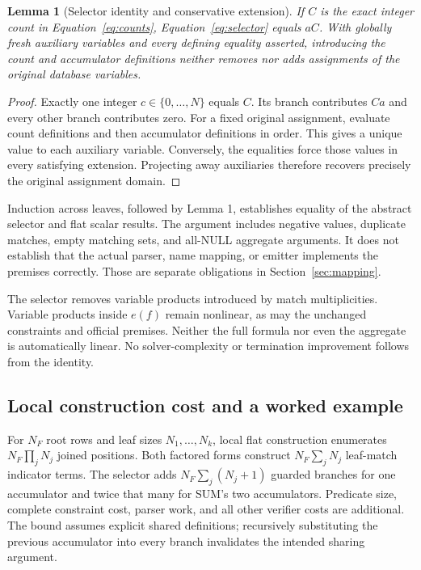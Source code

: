 \documentclass[3p,times,authoryear]{elsarticle}
\newtheorem{lemma}{Lemma}
\begin{document}
\begin{lemma}[Selector identity and conservative extension]
If $C$ is the exact integer count in Equation~\eqref{eq:counts}, Equation~\eqref{eq:selector} equals $aC$. With globally fresh auxiliary variables and every defining equality asserted, introducing the count and accumulator definitions neither removes nor adds assignments of the original database variables.
\end{lemma}
\begin{proof}
Exactly one integer $c\in\{0,\ldots,N\}$ equals $C$. Its branch contributes $Ca$ and every other branch contributes zero. For a fixed original assignment, evaluate count definitions and then accumulator definitions in order. This gives a unique value to each auxiliary variable. Conversely, the equalities force those values in every satisfying extension. Projecting away auxiliaries therefore recovers precisely the original assignment domain.
\end{proof}

Induction across leaves, followed by Lemma 1, establishes equality of the abstract selector and flat scalar results. The argument includes negative values, duplicate matches, empty matching sets, and all-NULL aggregate arguments. It does not establish that the actual parser, name mapping, or emitter implements the premises correctly. Those are separate obligations in Section~\ref{sec:mapping}.

The selector removes variable products introduced by match multiplicities. Variable products inside $e(f)$ remain nonlinear, as may the unchanged constraints and official premises. Neither the full formula nor even the aggregate is automatically linear. No solver-complexity or termination improvement follows from the identity.

\subsection{Local construction cost and a worked example}
For $N_F$ root rows and leaf sizes $N_1,\ldots,N_k$, local flat construction enumerates $N_F\prod_jN_j$ joined positions. Both factored forms construct $N_F\sum_jN_j$ leaf-match indicator terms. The selector adds $N_F\sum_j(N_j+1)$ guarded branches for one accumulator and twice that many for SUM's two accumulators. Predicate size, complete constraint cost, parser work, and all other verifier costs are additional. The bound assumes explicit shared definitions; recursively substituting the previous accumulator into every branch invalidates the intended sharing argument.
\end{document}
